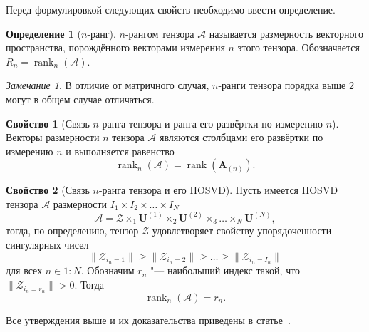 \documentclass[specialist,
    substylefile = spbu_report.rtx,
    subf,href,colorlinks=true, 12pt]{disser}
\theoremstyle{plain}
\theoremstyle{definition}
\newtheorem{definition}{Определение}[section]
\newtheorem{property}{Свойство}[section]
\theoremstyle{remark}
\newtheorem*{remark}{Замечание}
\begin{document}
    Перед формулировкой следующих свойств необходимо ввести определение.
    \begin{definition}[$n$-ранг]
        $n$-рангом тензора $\mathcal{A}$ называется размерность векторного пространства, порождённого векторами измерения $n$ этого тензора.
        Обозначается $R_n=\operatorname{rank}_{n}(\mathcal{A})$.
    \end{definition}

    \begin{remark}
        В отличие от матричного случая, $n$-ранги тензора порядка выше $2$ могут в общем случае отличаться.
    \end{remark}

    \begin{property}[Связь $n$-ранга тензора и ранга его развёртки по измерению $n$]
        Векторы размерности $n$ тензора $\mathcal{A}$ являются столбцами его развёртки по измерению $n$ и выполняется равенство
        \[\operatorname{rank}_{n}(\mathcal{A})=\operatorname{rank}(\mathbf{A}_{(n)}).\]
    \end{property}

    \begin{property}[Связь $n$-ранга тензора и его HOSVD]
        Пусть имеется HOSVD тензора $\mathcal{A}$ размерности $I_1\times I_2\times \ldots \times I_N$
        \[\mathcal{A} = \mathcal{Z}\times_1 \mathbf{U}^{(1)}\times_2\mathbf{U}^{(2)}\times_3\ldots \times_{N}\mathbf{U}^{(N)},\]
        тогда, по определению, тензор $\mathcal{Z}$ удовлетворяет свойству упорядоченности сингулярных чисел
        \[\|\mathcal{Z}_{i_n=1}\|\geqslant\|\mathcal{Z}_{i_n=2}\|\geqslant\ldots \geqslant \|\mathcal{Z}_{i_n=I_n}\|\]
        для всех $n\in \overline{1:N}$.
        Обозначим $r_n$ "--- наибольший индекс такой, что $\|\mathcal{Z}_{i_n=r_n}\|>0$.
        Тогда
        \begin{equation}
            \operatorname{rank}_n(\mathcal{A})=r_n.\label{eq:n-rank}
        \end{equation}
    \end{property}

    Все утверждения выше и их доказательства приведены в статье~\cite{hosvd}.
\end{document}
